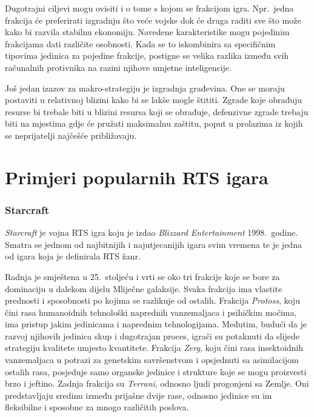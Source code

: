 \documentclass[times, utf8, zavrsni, numeric]{fer}
\begin{document}
\par Dugotrajni ciljevi mogu ovisiti i o tome s kojom se frakcijom igra. 
Npr.\ jedna frakcija će preferirati izgradnju što veće vojske dok će druga raditi sve što može kako bi razvila stabilnu ekonomiju.
Navedene karakteristike mogu pojedinim frakcijama dati različite osobnosti.
Kada se to iskombinira sa specifičnim tipovima jedinica za pojedine frakcije, postigne se velika razlika između svih računalnih protivnika na razini njihove umjetne inteligencije.

\par Još jedan izazov za makro-strategiju je izgradnja građevina.
One se moraju postaviti u relativnoj blizini kako bi se lakše mogle štititi.
Zgrade koje obrađuju resurse bi trebale biti u blizini resursa koji se obrađuje, defenzivne zgrade trebaju biti na mjestima gdje će pružati maksimalnu zaštitu, poput u prolazima iz kojih se neprijatelji najčešće približavaju.

\section{Primjeri popularnih RTS igara}

\subsubsection{Starcraft}
\par \textit{Starcraft} je vojna RTS igra koju je izdao \textit{Blizzard Entertainment} 1998.\ godine. 
Smatra se jednom od najbitnijih i najutjecanijih igara svim vremena te je jedna od igara koja je definirala RTS žanr.

\par Radnja je smještena u 25.\ stoljeću i vrti se oko tri frakcije koje se bore za dominaciju u dalekom dijelu Mliječne galaksije. 
Svaka frakcija ima vlastite prednosti i sposobnosti po kojima se razlikuje od ostalih. 
Frakcija \textit{Protoss}, koju čini rasa humanoidnih tehnološki naprednih vanzemaljaca i psihičkim moćima, ima pristup jakim jedinicama i naprednim tehnologijama.
Međutim, budući da je razvoj njihovih jedinica skup i dugotrajan proces, igrači su potaknuti da slijede strategiju kvalitete umjesto kvantitete.
Frakcija \textit{Zerg}, koju čini rasa insektoidnih vanzemaljaca u potrazi za genetskim savršenstvom i opsjednuti sa asimilacijom ostalih rasa, posjeduje samo organske jedinice i strukture koje se mogu proizvesti brzo i jeftino.
Zadnja frakcija su \textit{Terrani}, odnosno ljudi progonjeni sa Zemlje.
Oni predstavljaju sredinu između prijašne dvije rase, odnosno jedinice su im fleksibilne i sposobne za mnogo različitih poslova.
\end{document}
